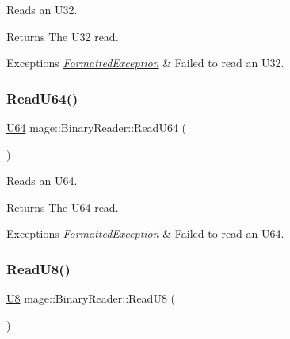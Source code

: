 Reads an {\ttfamily U32}.

\begin{DoxyReturn}{Returns}
The {\ttfamily U32} read. 
\end{DoxyReturn}

\begin{DoxyExceptions}{Exceptions}
{\em \hyperlink{structmage_1_1_formatted_exception}{Formatted\+Exception}} & Failed to read an {\ttfamily U32}. \\
\hline
\end{DoxyExceptions}
\hypertarget{classmage_1_1_binary_reader_ab702702eeb211d465026482bf25601d9}{}\label{classmage_1_1_binary_reader_ab702702eeb211d465026482bf25601d9} 
\subsubsection{\texorpdfstring{Read\+U64()}{ReadU64()}}
{\footnotesize\ttfamily \hyperlink{namespacemage_a6672cf3c861707ce4a3235a3eb43941d}{U64} mage\+::\+Binary\+Reader\+::\+Read\+U64 (\begin{DoxyParamCaption}{ }\end{DoxyParamCaption})\hspace{0.3cm}{\ttfamily [protected]}}

Reads an {\ttfamily U64}.

\begin{DoxyReturn}{Returns}
The {\ttfamily U64} read. 
\end{DoxyReturn}

\begin{DoxyExceptions}{Exceptions}
{\em \hyperlink{structmage_1_1_formatted_exception}{Formatted\+Exception}} & Failed to read an {\ttfamily U64}. \\
\hline
\end{DoxyExceptions}
\hypertarget{classmage_1_1_binary_reader_a913fdfead6b61b17ad2d2f9f54ccf057}{}\label{classmage_1_1_binary_reader_a913fdfead6b61b17ad2d2f9f54ccf057} 
\subsubsection{\texorpdfstring{Read\+U8()}{ReadU8()}}
{\footnotesize\ttfamily \hyperlink{namespacemage_afc638980bc6154f15af5e2d93a0e0ea9}{U8} mage\+::\+Binary\+Reader\+::\+Read\+U8 (\begin{DoxyParamCaption}{ }\end{DoxyParamCaption})\hspace{0.3cm}{\ttfamily [protected]}}

